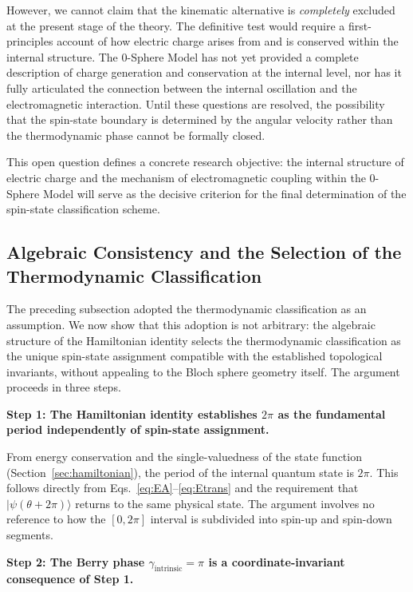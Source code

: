 \documentclass[%
 reprint,
 amsmath,amssymb,
 aps,
 prb,
]{revtex4-2}
\numberwithin{equation}{section}
\theoremstyle{definition}
\theoremstyle{remark}
\begin{document}
However, we cannot claim that the kinematic alternative is \emph{completely} excluded at the present stage of the theory. The definitive test would require a first-principles account of how electric charge arises from and is conserved within the internal structure. The 0-Sphere Model has not yet provided a complete description of charge generation and conservation at the internal level, nor has it fully articulated the connection between the internal oscillation and the electromagnetic interaction. Until these questions are resolved, the possibility that the spin-state boundary is determined by the angular velocity rather than the thermodynamic phase cannot be formally closed.

This open question defines a concrete research objective: the internal structure of electric charge and the mechanism of electromagnetic coupling within the 0-Sphere Model will serve as the decisive criterion for the final determination of the spin-state classification scheme.

\subsection{Algebraic Consistency and the Selection of the Thermodynamic Classification}
\label{sec:classification_argument}

The preceding subsection adopted the thermodynamic classification as an assumption. We now show that this adoption is not arbitrary: the algebraic structure of the Hamiltonian identity selects the thermodynamic classification as the unique spin-state assignment compatible with the established topological invariants, without appealing to the Bloch sphere geometry itself. The argument proceeds in three steps.

\textbf{Step 1: The Hamiltonian identity establishes $2\pi$ as the fundamental period independently of spin-state assignment.}

From energy conservation and the single-valuedness of the state function (Section~\ref{sec:hamiltonian}), the period of the internal quantum state is $2\pi$. This follows directly from Eqs.~\eqref{eq:EA}--\eqref{eq:Etrans} and the requirement that $|\psi(\theta + 2\pi)\rangle$ returns to the same physical state. The argument involves no reference to how the $[0,2\pi]$ interval is subdivided into spin-up and spin-down segments.

\textbf{Step 2: The Berry phase $\gamma_{\text{intrinsic}} = \pi$ is a coordinate-invariant consequence of Step 1.}
\end{document}
